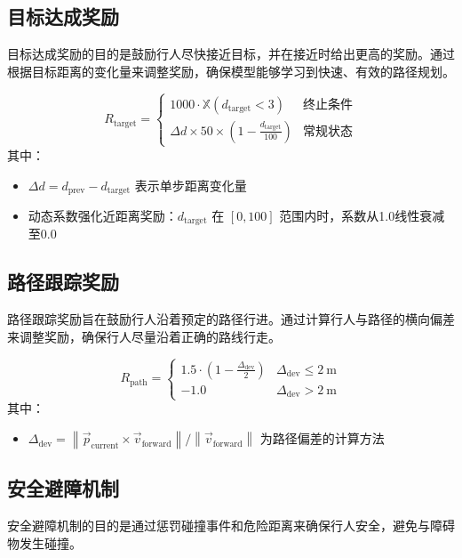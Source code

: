 	\subsection{目标达成奖励}
	目标达成奖励的目的是鼓励行人尽快接近目标，并在接近时给出更高的奖励。通过根据目标距离的变化量来调整奖励，确保模型能够学习到快速、有效的路径规划。
	
	\begin{equation}
	R_{\text{target}} =
	\begin{cases}
	1000 \cdot \mathbb{X}(d_{\text{target}}<3) & \text{终止条件} \\
	\Delta d \times 50 \times \left(1 - \frac{d_{\text{target}}}{100}\right) & \text{常规状态}
	\end{cases}
	\end{equation}
	其中：
	\begin{itemize}
	    \item \( \Delta d = d_{\text{prev}} - d_{\text{target}} \) 表示单步距离变化量
	    \item 动态系数强化近距离奖励：\( d_{\text{target}} \) 在 \([0, 100]\) 范围内时，系数从1.0线性衰减至0.0
	\end{itemize}
	
	\subsection{路径跟踪奖励}
	路径跟踪奖励旨在鼓励行人沿着预定的路径行进。通过计算行人与路径的横向偏差来调整奖励，确保行人尽量沿着正确的路线行走。
	
	\begin{equation}
	R_{\text{path}} =
	\begin{cases}
	1.5 \cdot \left(1 - \frac{\Delta_{\text{dev}}}{2}\right) & \Delta_{\text{dev}} \leq 2\ \text{m} \\
	-1.0 & \Delta_{\text{dev}} > 2\ \text{m}
	\end{cases}
	\end{equation}
	其中：
	\begin{itemize}
	    \item \( \Delta_{\text{dev}} = \left\| \vec{p}_{\text{current}} \times \vec{v}_{\text{forward}} \right\| / \left\| \vec{v}_{\text{forward}} \right\| \) 为路径偏差的计算方法
	\end{itemize}
	
	\subsection{安全避障机制}
	安全避障机制的目的是通过惩罚碰撞事件和危险距离来确保行人安全，避免与障碍物发生碰撞。
	
